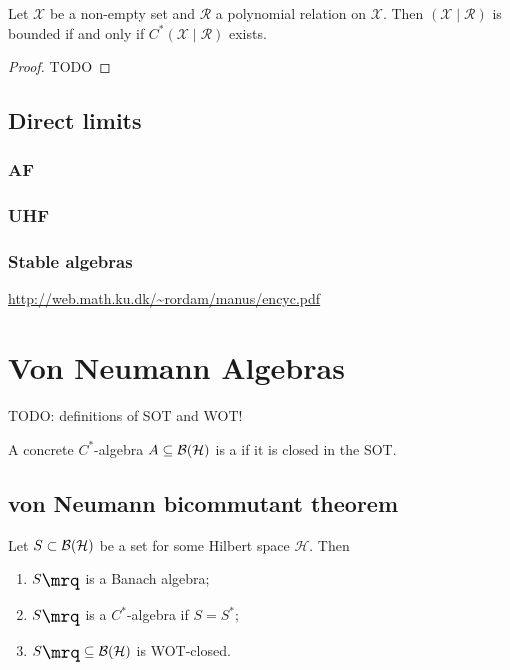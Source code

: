 \begin{proposition}
Let $\mathcal{X}$ be a non-empty set and $\mathcal{R}$ a polynomial relation on $\mathcal{X}$. Then $(\mathcal{X}\;|\; \mathcal{R})$ is bounded if and only if $C^*(\mathcal{X}\;|\;\mathcal{R})$ exists.
\end{proposition}
\begin{proof}
TODO
\end{proof}

\section{Direct limits}
\subsection{AF}
\subsection{UHF}
\subsection{Stable algebras}
\url{http://web.math.ku.dk/~rordam/manus/encyc.pdf}

\chapter{Von Neumann Algebras}
TODO: definitions of SOT and WOT!
\begin{definition}
A concrete $C^*$-algebra $A\subseteq \operatorname{\mathcal{B}}(\mathcal{H})$ is a  if it is closed in the SOT.
\end{definition}

\section{von Neumann bicommutant theorem}
\begin{proposition}
Let $S\subset \operatorname{\mathcal{B}}(\mathcal{H})$ be a set for some Hilbert space $\mathcal{H}$. Then
\begin{enumerate}
\item $\comm{S}$ is a Banach algebra;
\item $\comm{S}$ is a $C^*$-algebra if $S = S^*$;
\item $\comm{S}\subseteq \Bounded(\mathcal{H})$ is WOT-closed.
\end{enumerate}
\end{proposition}

